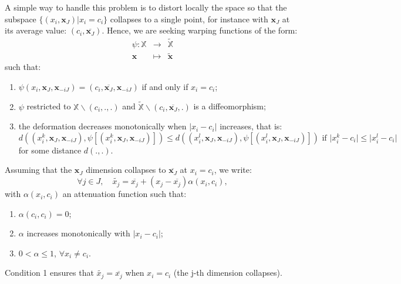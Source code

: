 \documentclass[a4paper,10pt]{article}
\newcommand{\x}{\mathbf{x}}
\newcommand{\Xset}{\mathbb{X}}
\begin{document}
A simple way to handle this problem is to distort locally the space so that the subspace $\{(x_i, \x_J) | x_i = c_i\}$ collapses to a single point,
for instance with $\x_J$ at its average value: $(c_i, \overline{\x_J})$.
Hence, we are seeking warping functions of the form: 
\begin{eqnarray*}
 \psi: \Xset &\rightarrow& \widetilde{\Xset} \\
 \x & \mapsto &  \widetilde{\x}
\end{eqnarray*}
such that:
\begin{enumerate}
 \item $\psi(x_i, \x_J, \x_{-iJ}) = (c_i, \overline{\x_J}, \x_{-iJ})$ if and only if $x_i=c_i$;%
 \item $\psi$ restricted to $\Xset \backslash (c_i,.,.)$ and $\widetilde{\Xset} \backslash (c_i,\overline{\x_J},.)$ is a diffeomorphism;
 \item the deformation decreases monotonically when $\lvert x_i - c_i\rvert$ increases, that is: 
 $$d \left( \left(x_i^{k}, \x_J, \x_{-iJ} \right), \psi\left[\left(x_i^{k}, \x_J, \x_{-iJ}\right)\right] \right)\leq d \left( \left(x_i^{l}, \x_J, \x_{-iJ} \right), 
 \psi\left[\left(x_i^{l}, \x_J, \x_{-iJ}\right)\right]\right) \text{ if }\lvert x_i^{k}- c_i\rvert \leq \lvert x_i^{l}- c_i\rvert $$
for some distance $d(.,.)$.
\end{enumerate}

Assuming that the $\x_J$ dimension collapses to $\overline{\x_J}$ at $x_i=c_i$, we write:
\begin{equation}
 \forall j \in J, \quad \widetilde{x_j} = \overline{x_j} + \left( x_j - \overline{x_j}\right)\alpha(x_i, c_i),
\end{equation}
with $\alpha(x_i, c_i)$ an attenuation function such that:
\begin{enumerate}
 \item $\alpha(c_i, c_i) = 0$;
 \item $\alpha$ increases monotonically with $\lvert x_i - c_i\rvert$;
 \item $0 < \alpha \leq 1$, $\forall x_i \neq c_i$.
\end{enumerate}
Condition 1 ensures that $\widetilde{x_j} = \overline{x_j}$ when $x_i=c_i$ (the j-th dimension collapses).
\end{document}

